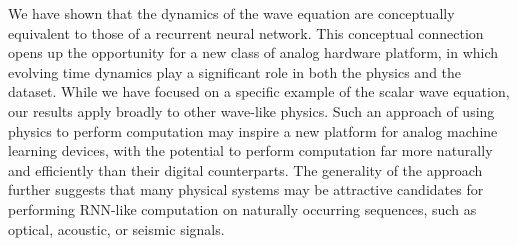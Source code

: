 We have shown that the dynamics of the wave equation are conceptually equivalent to those of a recurrent neural network.
This conceptual connection opens up the opportunity for a new class of analog hardware platform, in which evolving time dynamics play a significant role in both the physics and the dataset.
While we have focused on a specific example of the scalar wave equation, our results apply broadly to other wave-like physics.
Such an approach of using physics to perform computation \cite{silva_performing_2014, hermans_trainable_2015, guo_photonic_2018, lin2018all, kwon_nonlocal_2018, estakhri_inverse-designed_2019} may inspire a new platform for analog machine learning devices, with the potential to perform computation far more naturally and efficiently than their digital counterparts.
The generality of the approach further suggests that many physical systems may be attractive candidates for performing RNN-like computation on naturally occurring sequences, such as optical, acoustic, or seismic signals.

